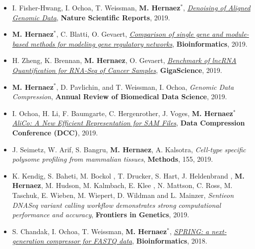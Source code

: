 \documentclass[11pt,a4paper,sans]{moderncv}        %
\begin{document}
\begin{itemize}
\item I. Fisher-Hwang, I. Ochoa,  T. Weissman, \textbf{M. Hernaez}$^\ast$, \href{https://www.nature.com/articles/s41598-019-51418-z}{\textsl{Denoising of Aligned Genomic Data}}, \textbf{Nature Scientific Reports}, 2019.\\

\item \textbf{M. Hernaez}$^\ast$, C. Blatti, O. Gevaert, \href{https://academic.oup.com/bioinformatics/advance-article-abstract/doi/10.1093/bioinformatics/btz549/5530163?redirectedFrom=fulltext}{\textsl{Comparison of single gene and module-based methods for modeling gene regulatory networks}}, \textbf{Bioinformatics}, 2019.\\

\item H. Zheng, K. Brennan, \textbf{M. Hernaez}, O. Gevaert, \href{https://www.biorxiv.org/content/early/2018/01/09/241869}{\textsl{Benchmark of lncRNA Quantification for RNA-Seq of Cancer Samples}}, \textbf{GigaScience}, 2019.\\

\item \textbf{M. Hernaez}$^\ast$, D. Pavlichin, and T. Weissman, I. Ochoa, \emph{Genomic Data Compression}, \textbf{Annual Review of Biomedical Data Science}, 2019. \\

\item I. Ochoa, H. Li, F. Baumgarte, C. Hergenrother, J. Voges, \textbf{M. Hernaez}$^\ast$ \href{}{\emph{ AliCo: A New Efficient Representation for SAM Files}}, {\textbf{ Data Compression Conference (DCC)}}, 2019. \\

\item J. Seimetz, W. Arif, S. Bangru, \textbf{M. Hernaez}, A. Kalsotra, \textsl{Cell-type specific polysome profiling from mammalian tissues}, \textbf{Methods}, 155, 2019.\\

\item K. Kendig, S. Baheti, M. Bockol , T. Drucker, S. Hart, J. Heldenbrand , \textbf{M. Hernaez}, M. Hudson, M. Kalmbach, E. Klee , N. Mattson, C. Ross, M. Taschuk, E. Wieben, M. Wiepert, D. Wildman and L. Mainzer, \textsl{Sentieon DNASeq variant calling workflow demonstrates strong computational performance and accuracy}, \textbf{Frontiers in Genetics}, 2019.\\

\item S. Chandak, I. Ochoa, T. Weissman, \textbf{M. Hernaez}$^\ast$, \href{https://doi.org/10.1093/bioinformatics/bty1015}{\textsl{SPRING: a next-generation compressor for FASTQ data}}, \textbf{Bioinformatics}, 2018.\\


\end{itemize}
\end{document}

